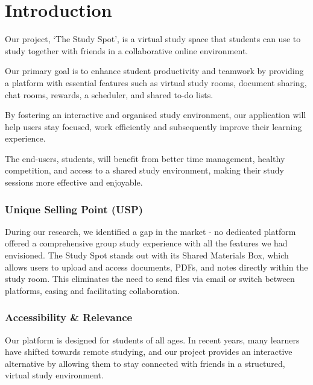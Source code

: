 \chapter{Introduction}
\label{chap:introduction}

Our project, ‘The Study Spot’, is a virtual study space that students can use to study together with friends in a collaborative online environment.

Our primary goal is to enhance student productivity and teamwork by providing a platform with essential features such as virtual study rooms, document sharing, chat rooms, rewards, a scheduler, and shared to-do lists.

By fostering an interactive and organised study environment, our application will help users stay focused, work efficiently and subsequently improve their learning experience.

The end-users, students, will benefit from better time management, healthy competition, and access to a shared study environment, making their study sessions more effective and enjoyable.

\subsection*{Unique Selling Point (USP)}
During our research, we identified a gap in the market - no dedicated platform offered a comprehensive group study experience with all the features we had envisioned. The Study Spot stands out with its Shared Materials Box, which allows users to upload and access documents, PDFs, and notes directly within the study room. This eliminates the need to send files via email or switch between platforms, easing and facilitating collaboration.

\subsection*{Accessibility \& Relevance}
Our platform is designed for students of all ages. In recent years, many learners have shifted towards remote studying, and our project provides an interactive alternative by allowing them to stay connected with friends in a structured, virtual study environment.

